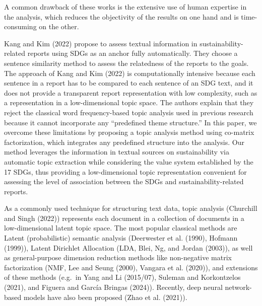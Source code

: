\documentclass[
]{article}
\begin{document}
A common drawback of these works is the extensive use of human expertise in the analysis, which reduces the objectivity of the results on one hand and is time-consuming on the other.

Kang and Kim (2022) propose to assess textual information in sustainability-related reports using SDGs as an anchor fully automatically. They choose a sentence similarity method to assess the relatedness of the reports to the goals. The approach of Kang and Kim (2022) is computationally intensive because each sentence in a report has to be compared to each sentence of an SDG text, and it does not provide a transparent report representation with low complexity, such as a representation in a low-dimensional topic space. The authors explain that they reject the classical word frequency-based topic analysis used in previous research because it cannot incorporate any ``predefined theme structure.'' In this paper, we overcome these limitations by proposing a topic analysis method using co-matrix factorization, which integrates any predefined structure into the analysis. Our method leverages the information in textual sources on sustainability via automatic topic extraction while considering the value system established by the 17 SDGs, thus providing a low-dimensional topic representation convenient for assessing the level of association between the SDGs and sustainability-related reports.

As a commonly used technique for structuring text data, topic analysis (Churchill and Singh (2022)) represents each document in a collection of documents in a low-dimensional latent topic space. The most popular classical methods are Latent (probabilistic) semantic analysis (Deerwester et al. (1990), Hofmann (1999)), Latent Dirichlet Allocation (LDA, Blei, Ng, and Jordan (2003)), as well as general-purpose dimension reduction methods like non-negative matrix factorization (NMF, Lee and Seung (2000), Vangara et al. (2020)), and extensions of these methods (e.g.~in Yang and Li (2015/07), Suleman and Korkontzelos (2021), and Figuera and García Bringas (2024)). Recently, deep neural network-based models have also been proposed (Zhao et al. (2021)).
\end{document}
